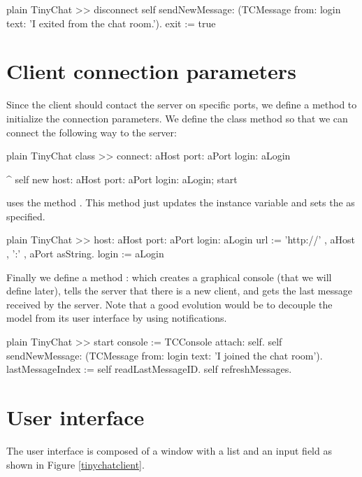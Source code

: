 \documentclass[10pt,twoside,english]{_support/latex/sbabook/sbabook}
\begin{document}
\begin{displaycode}{plain}
TinyChat >> disconnect
	self sendNewMessage: (TCMessage from: login text: 'I exited from the chat room.').
	exit := true
\end{displaycode}
\section{Client connection parameters}
Since the client should contact the server on specific ports, we define a method to 
initialize the connection parameters. We define the class method  so that we
can connect the following way to the server: 

\begin{displaycode}{plain}
TinyChat class >> connect: aHost port: aPort login: aLogin

	^ self new
		host: aHost port: aPort login: aLogin;
		start
\end{displaycode}

 uses the method . This method just updates the  instance variable and sets the  as specified.

\begin{displaycode}{plain}
TinyChat >> host: aHost port: aPort login: aLogin
	url := 'http://' , aHost , ':' , aPort asString.
	login := aLogin
\end{displaycode}

Finally we define a method : which creates a graphical console (that we will define later), tells the server
that there is a new client, and gets the last message received by the server. 
Note that a good evolution would be to decouple the model from its user interface by using notifications. 

\begin{displaycode}{plain}
TinyChat >> start
	console := TCConsole attach: self.
	self sendNewMessage: (TCMessage from: login text: 'I joined the chat room').
	lastMessageIndex := self readLastMessageID.
	self refreshMessages.
\end{displaycode}
\section{User interface}
The user interface is composed of a window with a list and an input field as shown in Figure \ref{tinychatclient}. 
\end{document}
